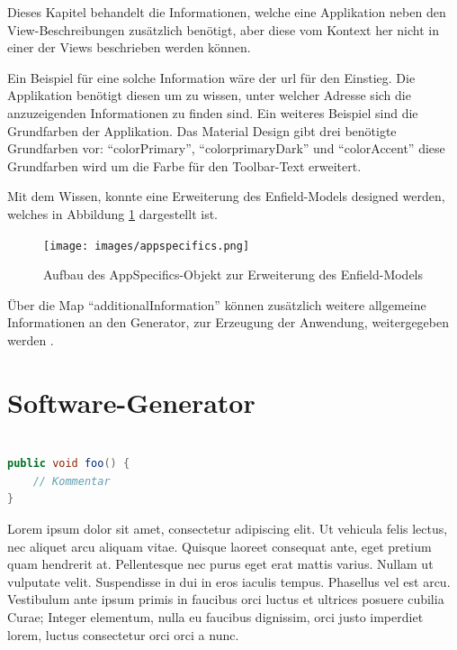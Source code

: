 Dieses Kapitel behandelt die Informationen, welche eine Applikation neben den View-Beschreibungen zusätzlich benötigt, aber diese vom Kontext her nicht in einer der Views beschrieben werden können.

Ein Beispiel für eine solche Information wäre der \acf{url} für den Einstieg. Die Applikation benötigt diesen um zu wissen, unter welcher Adresse sich die anzuzeigenden Informationen zu finden sind. Ein weiteres Beispiel sind die Grundfarben der Applikation. Das Material Design gibt drei benötigte Grundfarben vor: \enquote{colorPrimary}, \enquote{colorprimaryDark} und \enquote{colorAccent} diese Grundfarben wird um die Farbe für den Toolbar-Text erweitert.

Mit dem Wissen, konnte eine Erweiterung des Enfield-Models designed werden, welches in Abbildung \ref{fig:appspecifics} dargestellt ist.

\begin{figure}[H]
	\begin{center}
		\texttt{[image: images/appspecifics.png]}
		\caption{Aufbau des AppSpecifics-Objekt  zur Erweiterung des Enfield-Models}
		\label{fig:appspecifics}
	\end{center}
\end{figure}

 Über die Map \enquote{additionalInformation} können zusätzlich weitere allgemeine Informationen an den Generator, zur Erzeugung der Anwendung, weitergegeben werden .

\section{Software-Generator}











\begin{lstlisting}[label=lst:java,
				   language=java,
				   firstnumber=1,
				   caption=Beispiel für einen Quelltext]				   

public void foo() {				   
	// Kommentar
}
\end{lstlisting}

Lorem ipsum dolor sit amet, consectetur adipiscing elit. Ut vehicula felis lectus, nec aliquet arcu aliquam vitae. Quisque laoreet consequat ante, eget pretium quam hendrerit at. Pellentesque nec purus eget erat mattis varius. Nullam ut vulputate velit. Suspendisse in dui in eros iaculis tempus. Phasellus vel est arcu. Vestibulum ante ipsum primis in faucibus orci luctus et ultrices posuere cubilia Curae; Integer elementum, nulla eu faucibus dignissim, orci justo imperdiet lorem, luctus consectetur orci orci a nunc.

